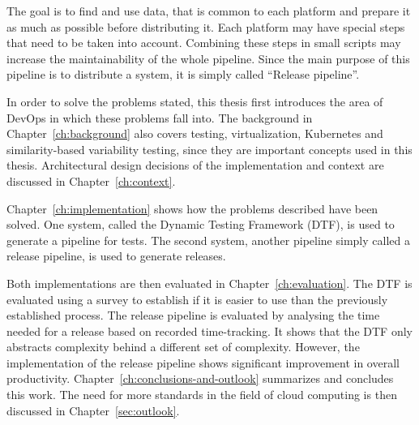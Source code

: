 The goal is to find and use data, that is common to each platform and prepare it as much as possible before distributing it.
Each platform may have special steps that need to be taken into account.
Combining these steps in small scripts may increase the maintainability of the whole pipeline.
Since the main purpose of this pipeline is to distribute a system, it is simply called ``Release pipeline''.

In order to solve the problems stated, this thesis first introduces the area of DevOps in which these problems fall into.
The background in Chapter~\ref{ch:background} also covers testing, virtualization, Kubernetes and similarity-based variability testing, since they are important concepts used in this thesis.
Architectural design decisions of the implementation and context are discussed in Chapter~\ref{ch:context}.

Chapter~\ref{ch:implementation} shows how the problems described have been solved.
One system, called the Dynamic Testing Framework (DTF), is used to generate a pipeline for tests.
The second system, another pipeline simply called a release pipeline, is used to generate releases.

\pagebreak

Both implementations are then evaluated in Chapter~\ref{ch:evaluation}.
The DTF is evaluated using a survey to establish if it is easier to use than the previously established process.
The release pipeline is evaluated by analysing the time needed for a release based on recorded time-tracking.
It shows that the DTF only abstracts complexity behind a different set of complexity.
However, the implementation of the release pipeline shows significant improvement in overall productivity.
Chapter~\ref{ch:conclusions-and-outlook} summarizes and concludes this work.
The need for more standards in the field of cloud computing is then discussed in Chapter~\ref{sec:outlook}.

